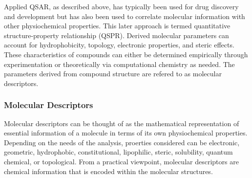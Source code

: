Applied QSAR, as described above, has typically been used for drug discovery and development but has also been used to correlate molecular information with other physiochemical properties. This later approach is termed quantitative structure-property relationship (QSPR). Derived molecular parameters can account for hydrophobicity, topology, electronic properties, and steric effects. These characteristics of compounds can either be determined empirically through experimentation or theoretically via computational chemistry as needed. \cite{Nantasenamat2009} The parameters derived from compound structure are refered to as molecular descriptors.




\subsubsection{Molecular Descriptors}
Molecular descriptors can be thought of as the mathematical representation of essential information of a molecule in terms of its own physiochemical properties. Depending on the needs of the analysis, proerties considered can be electronic, geometric, hydrophobic, constitutional, lipophilic, steric, solubility, quantum chemical, or topological. From a practical viewpoint, molecular descriptors are chemical information that is encoded within the molecular structures. \cite{Nantasenamat2009}

